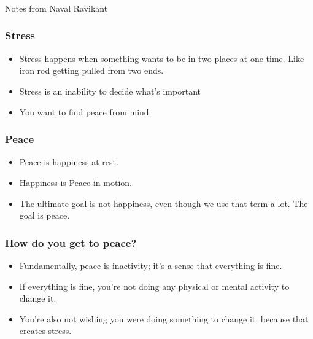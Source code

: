 \begin{frame}[fragile]\frametitle{}
\begin{center}
{\Large Notes from Naval Ravikant}

\end{center}
\end{frame}




\begin{frame}[fragile]\frametitle{Stress}

	\begin{itemize}
	\item Stress happens when something wants to be in two places at one time. Like iron rod getting pulled from two ends.
	\item Stress is an inability to decide what’s important
	\item You want to find peace from mind. 
	\end{itemize}

\end{frame}

\begin{frame}[fragile]\frametitle{Peace}

	\begin{itemize}
	\item Peace is happiness at rest.
	\item Happiness is Peace in motion.
	\item The ultimate goal is not happiness, even though we use that term a lot. The goal is peace.
	\end{itemize}

\end{frame}

\begin{frame}[fragile]\frametitle{How do you get to peace?}

	\begin{itemize}
	\item Fundamentally, peace is inactivity; it’s a sense that everything is fine.
	\item If everything is fine, you’re not doing any physical or mental activity to change it. 
	\item You’re also not wishing you were doing something to change it, because that creates stress. 
	\end{itemize}

\end{frame}

